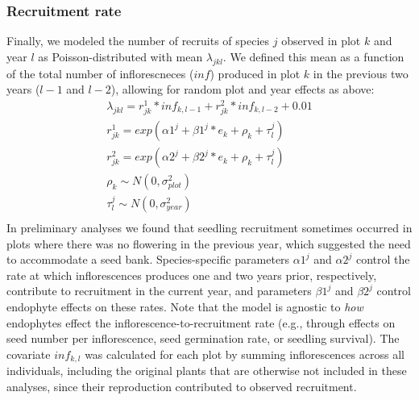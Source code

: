 \documentclass[11pt]{article}
\begin{document}
\subsubsection*{Recruitment rate}
Finally, we modeled the number of recruits of species $j$ observed in plot $k$ and year $l$ as Poisson-distributed with mean $\lambda_{jkl}$. 
We defined this mean as a function of the total number of inflorescneces ($inf$) produced in plot $k$ in the previous two years ($l-1$ and $l-2$), allowing for random plot and year effects as above:
\begin{align*}
	\lambda_{jkl} = r^{1}_{jk} * inf_{k,l-1} + r^{2}_{jk} * inf_{k,l-2} + 0.01\\
	r^{1}_{jk} = exp(\alpha1^{j} + \beta1^{j}*e_k + \rho_k + \tau^{j}_{l})\\
	r^{2}_{jk} = exp(\alpha2^{j} + \beta2^{j}*e_k + \rho_k + \tau^{j}_{l})\\	\rho_k \sim N(0,\sigma^2_{plot})\\
	\tau^{j}_{l} \sim N(0,\sigma^2_{year})\\
\end{align*}
In preliminary analyses we found that seedling recruitment sometimes occurred in plots where there was no flowering in the previous year, which suggested the need to accommodate a seed bank. 
Species-specific parameters $\alpha1^{j}$ and $\alpha2^{j}$ control the rate at which inflorescences produces one and two years prior, respectively, contribute to recruitment in the current year, and parameters $\beta1^{j}$ and $\beta2^{j}$ control endophyte effects on these rates. 
Note that the model is agnostic to \emph{how} endophytes effect the inflorescence-to-recruitment rate (e.g., through effects on seed number per inflorescence, seed germination rate, or seedling survival). 
The covariate $inf_{k,l}$ was calculated for each plot by summing inflorescences across all individuals, including the original plants that are otherwise not included in these analyses, since their reproduction contributed to observed recruitment. 
\end{document}
